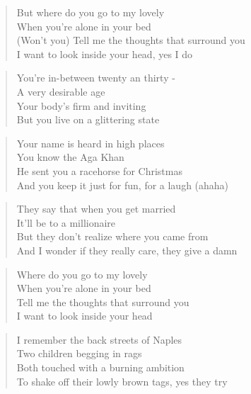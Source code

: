 \documentclass[9pt,a4paper,oneside, onecolumn]{article}
\begin{document}
\begin{multicols}{2}
\begin{verse}
But where do you go to my lovely\\
When you're alone in your bed\\
(Won't you) Tell me the thoughts that surround you\\
I want to look inside your head, yes I do\\
\end{verse}

\begin{verse}
You're in-between twenty an thirty -\\
A very desirable age\\
Your body's firm and inviting\\
But you live on a glittering state\\
\end{verse}

\begin{verse}
Your name is heard in high places\\
You know the Aga Khan\\
He sent you a racehorse for Christmas\\
And you keep it just for fun, for a laugh (ahaha)\\
\end{verse}

\begin{verse}
They say that when you get married\\
It'll be to a millionaire\\
But they don't realize where you came from\\
And I wonder if they really care, they give a damn\\
\end{verse}

\begin{verse}
Where do you go to my lovely\\
When you're alone in your bed\\
Tell me the thoughts that surround you\\
I want to look inside your head\\
\end{verse}

\begin{verse}
I remember the back streets of Naples\\
Two children begging in rags\\
Both touched with a burning ambition\\
To shake off their lowly brown tags, yes they try\\
\end{verse}


\end{multicols}
\end{document}

